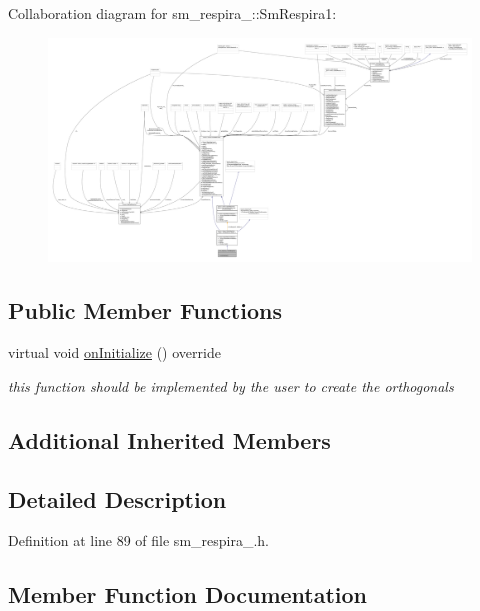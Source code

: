 Collaboration diagram for sm\+\_\+respira\+\_\+:\+:Sm\+Respira1\+:
\nopagebreak
\begin{figure}[H]
\begin{center}
\leavevmode
\includegraphics[width=350pt]{structsm__respira__1_1_1SmRespira1__coll__graph}
\end{center}
\end{figure}
\subsection*{Public Member Functions}
\begin{DoxyCompactItemize}
\item 
virtual void \hyperlink{structsm__respira__1_1_1SmRespira1_a6be26eb018ef73a2e39772fe4a03e551}{on\+Initialize} () override
\begin{DoxyCompactList}\small\item\em this function should be implemented by the user to create the orthogonals \end{DoxyCompactList}\end{DoxyCompactItemize}
\subsection*{Additional Inherited Members}


\subsection{Detailed Description}


Definition at line 89 of file sm\+\_\+respira\+\_.\+h.



\subsection{Member Function Documentation}
\mbox{\label{structsm__respira__1_1_1SmRespira1_a6be26eb018ef73a2e39772fe4a03e551}} 
